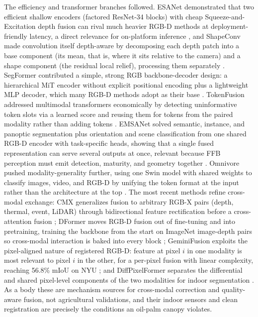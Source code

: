 The efficiency and transformer branches followed. ESANet demonstrated that two efficient shallow encoders (factored ResNet-34 blocks) with cheap Squeeze-and-Excitation depth fusion can rival much heavier RGB-D methods at deployment-friendly latency, a direct relevance for on-platform inference \cite{seichter2021esanet}, and ShapeConv made convolution itself depth-aware by decomposing each depth patch into a base component (its mean, that is, where it sits relative to the camera) and a shape component (the residual local relief), processing them separately \cite{cao2021shapeconv}. SegFormer contributed a simple, strong RGB backbone-decoder design: a hierarchical MiT encoder without explicit positional encoding plus a lightweight MLP decoder, which many RGB-D methods adopt as their base \cite{xie2021segformer}. TokenFusion addressed multimodal transformers economically by detecting uninformative token slots via a learned score and reusing them for tokens from the paired modality rather than adding tokens \cite{wang2022tokenfusion}. EMSANet solved semantic, instance, and panoptic segmentation plus orientation and scene classification from one shared RGB-D encoder with task-specific heads, showing that a single fused representation can serve several outputs at once, relevant because FFB perception must emit detection, maturity, and geometry together \cite{seichter2022emsanet}. Omnivore pushed modality-generality further, using one Swin model with shared weights to classify images, video, and RGB-D by unifying the token format at the input rather than the architecture at the top \cite{girdhar2022omnivore}. The most recent methods refine cross-modal exchange: CMX generalizes fusion to arbitrary RGB-X pairs (depth, thermal, event, LiDAR) through bidirectional feature rectification before a cross-attention fusion \cite{zhang2023cmx}; DFormer moves RGB-D fusion out of fine-tuning and into pretraining, training the backbone from the start on ImageNet image-depth pairs so cross-modal interaction is baked into every block \cite{yin2024dformer}; GeminiFusion exploits the pixel-aligned nature of registered RGB-D: feature at pixel $i$ in one modality is most relevant to pixel $i$ in the other, for a per-pixel fusion with linear complexity, reaching 56.8\% mIoU on NYU \cite{jia2024geminifusion}; and DiffPixelFormer separates the differential and shared pixel-level components of the two modalities for indoor segmentation \cite{gong2025diffpixelformer}. As a body these are mechanism sources for cross-modal correction and quality-aware fusion, not agricultural validations, and their indoor sensors and clean registration are precisely the conditions an oil-palm canopy violates.

